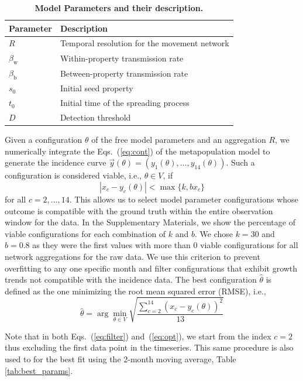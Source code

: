 \documentclass[aps,physrev,reprint,superscriptaddress]{revtex4-1}
\begin{document}
\begin{table}[t]
\centering
\caption{\textbf{Model Parameters and their description.} 
}
\begin{tabular}{ll}
\hline
\textbf{Parameter} & \textbf{Description}  \\
\hline
\hline
$R$ & Temporal resolution for the movement network \\
$\beta_{\mathrm{w}}$ & Within-property transmission rate  \\
$\beta_{\mathrm{b}}$ & Between-property transmission rate  \\
$s_0$ & Initial seed property \\
$t_0$ & Initial time of the spreading process \\
$D$ & Detection threshold   \\
\hline
\end{tabular}
\label{tab:model_params}
\end{table}
Given a configuration $\theta$ of the free model parameters and an aggregation $R$, we numerically integrate the Eqs.~(\ref{eq:cont}) of the metapopulation model to generate the incidence curve $\vec{y}(\theta) = (y_1(\theta), \ldots, y_{14}(\theta))$. Such a configuration is considered viable, i.e., $\theta \in V$, if  
\begin{equation}
 |x_c - y_c(\theta)| < \max \{ k, b x_c \}
 \label{eq:filter}
\end{equation}
for all $c = 2, \ldots, 14$. This allows us to select model parameter configurations whose outcome is compatible with the ground truth within the entire observation window for the data. In the Supplementary Materials, we show the percentage of viable configurations for each combination of $k$ and $b$. We chose $k=30$ and $b=0.8$ as they were the first values with more than $0$ viable configurations for all network aggregations for the raw data.  We use this criterion to prevent overfitting to any one specific month and filter configurations that exhibit growth trends not compatible with the incidence data. The best configuration $\hat{\theta}$ is defined as the one minimizing the root mean squared error (RMSE), i.e., 
 \begin{equation}
    \hat{\theta} =  \arg \min_{ \theta \in V } \sqrt{\frac{\sum_{c=2}^{14} (x_c - y_c(\theta))^2}{13}}
    \label{eq:opt}
 \end{equation}
 
Note that in both Eqs.~(\ref{eq:filter}) and~(\ref{eq:opt}), we start from the index $c=2$ thus excluding the first data point in the timeseries. This same procedure is also used to for the best fit using the 2-month moving average, Table \ref{tab:best_params}. 
\end{document}

